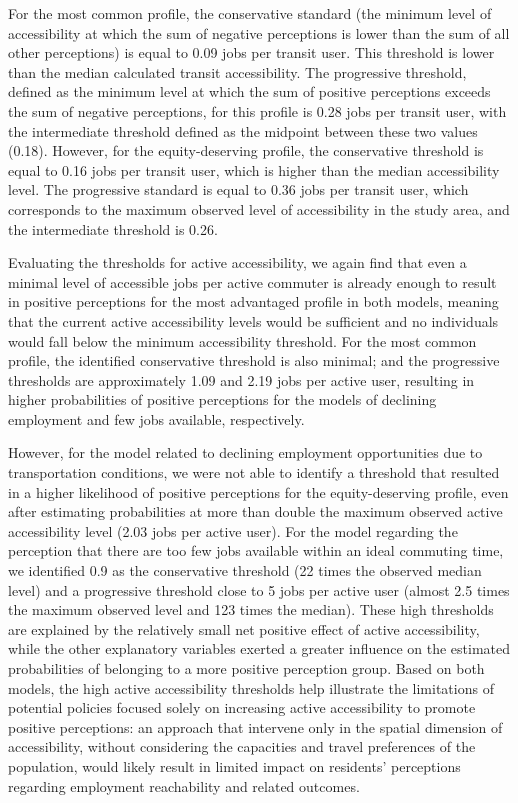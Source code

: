 \documentclass[preprint, 3p,
authoryear]{elsarticle} %
\begin{document}
For the most common profile, the conservative standard (the minimum
level of accessibility at which the sum of negative perceptions is lower
than the sum of all other perceptions) is equal to 0.09 jobs per transit
user. This threshold is lower than the median calculated transit
accessibility. The progressive threshold, defined as the minimum level
at which the sum of positive perceptions exceeds the sum of negative
perceptions, for this profile is 0.28 jobs per transit user, with the
intermediate threshold defined as the midpoint between these two values
(0.18). However, for the equity-deserving profile, the conservative
threshold is equal to 0.16 jobs per transit user, which is higher than
the median accessibility level. The progressive standard is equal to
0.36 jobs per transit user, which corresponds to the maximum observed
level of accessibility in the study area, and the intermediate threshold
is 0.26.

Evaluating the thresholds for active accessibility, we again find that
even a minimal level of accessible jobs per active commuter is already
enough to result in positive perceptions for the most advantaged profile
in both models, meaning that the current active accessibility levels
would be sufficient and no individuals would fall below the minimum
accessibility threshold. For the most common profile, the identified
conservative threshold is also minimal; and the progressive thresholds
are approximately 1.09 and 2.19 jobs per active user, resulting in
higher probabilities of positive perceptions for the models of declining
employment and few jobs available, respectively.

However, for the model related to declining employment opportunities due
to transportation conditions, we were not able to identify a threshold
that resulted in a higher likelihood of positive perceptions for the
equity-deserving profile, even after estimating probabilities at more
than double the maximum observed active accessibility level (2.03 jobs
per active user). For the model regarding the perception that there are
too few jobs available within an ideal commuting time, we identified 0.9
as the conservative threshold (22 times the observed median level) and a
progressive threshold close to 5 jobs per active user (almost 2.5 times
the maximum observed level and 123 times the median). These high
thresholds are explained by the relatively small net positive effect of
active accessibility, while the other explanatory variables exerted a
greater influence on the estimated probabilities of belonging to a more
positive perception group. Based on both models, the high active
accessibility thresholds help illustrate the limitations of potential
policies focused solely on increasing active accessibility to promote
positive perceptions: an approach that intervene only in the spatial
dimension of accessibility, without considering the capacities and
travel preferences of the population, would likely result in limited
impact on residents' perceptions regarding employment reachability and
related outcomes.
\end{document}
